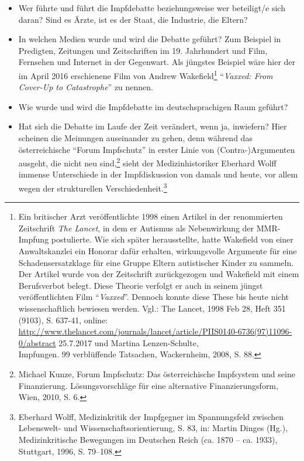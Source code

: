 \documentclass[
    a4paper,
    12pt,
    hyphens,
    chapterprefix=true,
    headheight=33pt,
    footheight=29pt,
    headings=optiontohead, %
]{scrartcl}
\begin{document}
\begin{itemize}
\item{Wer führte und führt die Impfdebatte beziehungsweise wer beteiligt/e sich daran? Sind es Ärzte, ist es der Staat, die Industrie, die Eltern?}
\item{In welchen Medien wurde und wird die Debatte geführt? Zum Beispiel in Predigten, Zeitungen und Zeitschriften im 19. Jahrhundert und Film, Fernsehen und Internet in der Gegenwart. Als jüngstes Beispiel wäre hier der im April 2016 erschienene Film von Andrew Wakefield\footnote{Ein britischer Arzt veröffentlichte 1998 einen Artikel in der renommierten Zeitschrift \textit{The Lancet}, in dem er Autismus als Nebenwirkung der MMR-Impfung postulierte. Wie sich später herausstellte, hatte Wakefield von einer Anwaltskanzlei ein Honorar dafür erhalten, wirkungsvolle Argumente für eine Schadensersatzklage für eine Gruppe Eltern autistischer Kinder zu sammeln. Der Artikel wurde von der Zeitschrift zurückgezogen und Wakefield mit einem Berufsverbot belegt. Diese Theorie verfolgt er auch in seinem jüngst veröffentlichten Film "`\textit{Vaxxed}"'. Dennoch konnte diese These bis heute nicht wissenschaftlich bewiesen werden. Vgl.: The Lancet, 1998 Feb 28, Heft 351 (9103), S. 637-41, online: \url{http://www.thelancet.com/journals/lancet/article/PIIS0140-6736(97)11096-0/abstract} 25.7.2017 und Martina Lenzen-Schulte, \\Impfungen. 99 verblüffende Tatsachen, Wackernheim, 2008, S. 88.} "`\textit{Vaxxed: From Cover-Up to Catastrophe}"'} zu nennen.
\item{Wie wurde und wird die Impfdebatte im deutschsprachigen Raum geführt? }
\item{Hat sich die Debatte im Laufe der Zeit verändert, wenn ja, inwiefern? Hier scheinen die Meinungen auseinander zu gehen, denn während das österreichische "`Forum Impfschutz"' in erster Linie von (Contra-)Argumenten ausgeht, die nicht neu sind,\footnote{Michael Kunze, Forum Impfschutz: Das österreichische Impfsystem und seine Finanzierung. Lösungsvorschläge für eine alternative Finanzierungsform, Wien, 2010, S. 6.} sieht der Medizinhistoriker Eberhard Wolff immense Unterschiede in der Impfdiskussion von damals und heute, vor allem wegen der strukturellen Verschiedenheit.\footnote{Eberhard Wolff, Medizinkritik der Impfgegner im Spannungsfeld zwischen Lebenswelt- und Wissenschaftsorientierung, S. 83, in: Martin Dinges (Hg.), Medizinkritische Bewegungen im Deutschen Reich (ca. 1870 -- ca. 1933), Stuttgart, 1996, S. 79--108.} }
\end{itemize}
\end{document}
